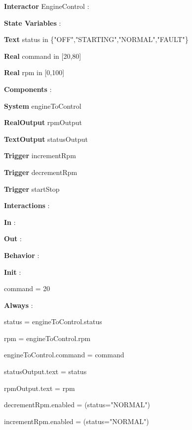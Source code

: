 \documentclass[11pt]{article} %
\begin{document}
\indent\textbf{Interactor} EngineControl :

    \indent\indent\textbf{State Variables} :

        \indent\indent\indent\textbf{Text} status in \{"OFF","STARTING","NORMAL","FAULT"\}

        \indent\indent\indent\textbf{Real} command in [20,80]

        \indent\indent\indent\textbf{Real} rpm in [0,100]

    \indent\indent\textbf{Components} :

        \indent\indent\indent\textbf{System} engineToControl

        \indent\indent\indent\textbf{RealOutput} rpmOutput

        \indent\indent\indent\textbf{TextOutput} statusOutput

        \indent\indent\indent\textbf{Trigger} incrementRpm

        \indent\indent\indent\textbf{Trigger} decrementRpm

        \indent\indent\indent\textbf{Trigger} startStop

    \indent\indent\textbf{Interactions} :

    \indent\indent\indent\textbf{In} :

    \indent\indent\indent\textbf{Out} :


    \indent\indent\textbf{Behavior} :

        \indent\indent\indent\textbf{Init} :

            \indent\indent\indent\indent command = 20

        \indent\indent\indent\textbf{Always} : 

            \indent\indent\indent\indent status = engineToControl.status

            \indent\indent\indent\indent rpm = engineToControl.rpm

	    \indent\indent\indent\indent engineToControl.command = command 

            \indent\indent\indent\indent statusOutput.text = status

            \indent\indent\indent\indent rpmOutput.text = rpm

            \indent\indent\indent\indent decrementRpm.enabled = (status="NORMAL")

            \indent\indent\indent\indent incrementRpm.enabled = (status="NORMAL")
\end{document}
